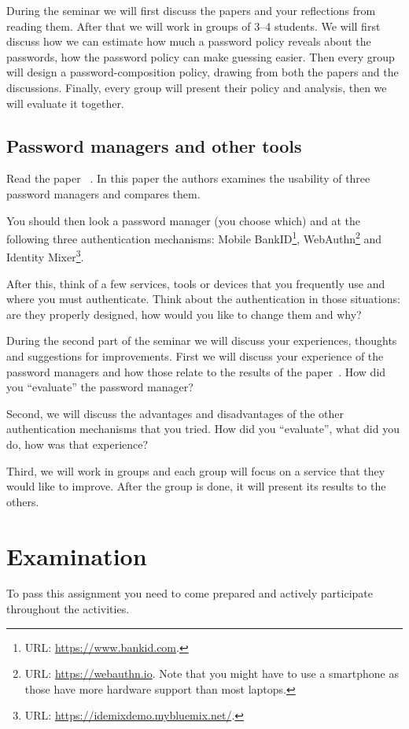 During the seminar we will first discuss the papers and your reflections from 
reading them.
After that we will work in groups of 3--4 students.
We will first discuss how we can estimate how much a password policy reveals 
about the passwords, \ie how the password policy can make guessing easier.
Then every group will design a password-composition policy, drawing from both 
the papers and the discussions.
Finally, every group will present their policy and analysis, then we will 
evaluate it together.

\subsection{Password managers and other tools}

Read the paper 
~\cite{UsabilityEvaluationOfPasswordManagers}.
In this paper the authors examines the usability of three password managers and 
compares them.

You should then look a password manager (you choose which) and at the following 
three authentication mechanisms:
Mobile BankID\footnote{%
  URL: \url{https://www.bankid.com}.
},
WebAuthn\footnote{%
  URL: \url{https://webauthn.io}.
  Note that you might have to use a smartphone as those have more hardware 
  support than most laptops.
} and
Identity Mixer\footnote{%
  URL: \url{https://idemixdemo.mybluemix.net/}.
}.

After this, think of a few services, tools or devices that you frequently use 
and where you must authenticate.
Think about the authentication in those situations: are they properly designed, 
how would you like to change them and why?

During the second part of the seminar we will discuss your experiences, 
thoughts and suggestions for improvements.
First we will discuss your experience of the password managers and how those 
relate to the results of the 
paper~\cite{UsabilityEvaluationOfPasswordManagers}.
How did you \enquote{evaluate} the password manager?

Second, we will discuss the advantages and disadvantages of the other 
authentication mechanisms that you tried.
How did you \enquote{evaluate}, what did you do, how was that experience?

Third, we will work in groups and each group will focus on a service that they 
would like to improve.
After the group is done, it will present its results to the others.


\section{Examination}%
\label{sec:exam}

To pass this assignment you need to come prepared and actively participate 
throughout the activities.


\printbibliography
